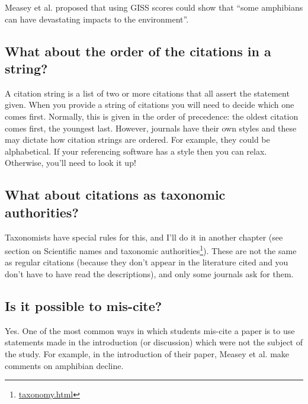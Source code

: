 \documentclass[
]{krantz}
\renewenvironment{quote}{\begin{VF}}{\end{VF}}
\renewcommand{\href}[2]{#2\footnote{\url{#1}}}
\begin{document}
\begin{quote}
Measey et al. \citeyearpar[976]{measey2016global} proposed that using GISS scores could show that ``some amphibians can have devastating impacts to the environment''.
\end{quote}

\hypertarget{what-about-the-order-of-the-citations-in-a-string}{%
\subsection{What about the order of the citations in a string?}\label{what-about-the-order-of-the-citations-in-a-string}}

A citation string is a list of two or more citations that all assert the statement given. When you provide a string of citations you will need to decide which one comes first. Normally, this is given in the order of precedence: the oldest citation comes first, the youngest last. However, journals have their own styles and these may dictate how citation strings are ordered. For example, they could be alphabetical. If your referencing software has a style then you can relax. Otherwise, you'll need to look it up!

\hypertarget{what-about-citations-as-taxonomic-authorities}{%
\subsection{What about citations as taxonomic authorities?}\label{what-about-citations-as-taxonomic-authorities}}

Taxonomists have special rules for this, and I'll do it in another chapter (see section on \href{taxonomy.html}{Scientific names and taxonomic authorities}). These are not the same as regular citations (because they don't appear in the literature cited and you don't have to have read the descriptions), and only some journals ask for them.

\hypertarget{is-it-possible-to-mis-cite}{%
\subsection{Is it possible to mis-cite?}\label{is-it-possible-to-mis-cite}}

Yes. One of the most common ways in which students mis-cite a paper is to use statements made in the introduction (or discussion) which were not the subject of the study. For example, in the introduction of their paper, Measey et al. \citeyearpar{measey2016global} make comments on amphibian decline.
\end{document}
